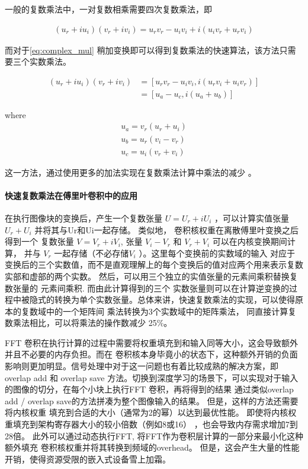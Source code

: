 一般的复数乘法中，一对复数相乘需要四次复数乘法，即

\begin{align}
\label{eq:complex_mul}
(u_r + i u_i)(v_r + i v_i) = u_r v_r - u_i v_i + i ( u_i v_r + u_r v_i )
\end{align}

而对于\ref{eq:complex_mul} 稍加变换即可以得到复数乘法的快速算法，该方法只需要三个实数乘法。

\begin{align}
\label{eq:complex_mul_fast}
  (u_r + i u_i) (v_r + i v_i) &= [ u_r v_r - u_i v_i, i(u_r v_i + u_i v_r)]\\
                               &= [ u_a - u_c,i( u_a + u_b) ]
\end{align}

where 
\begin{align}
u_a = v_r ( u_r + u_i )\\
u_b = u_r ( v_i - v_r )\\
u_c = u_i ( v_r + v_i )
\end{align}

这一方法，通过使用更多的加法实现在复数乘法计算中乘法的减少 。

\paragraph{快速复数乘法在傅里叶卷积中的应用}

在执行图像块的变换后，产生一个复数张量 $U = U_r + i U_i$ ，可以计算实值张量 $U_r + U_i$ 并将其与Ur和Ui一起存储。 类似地， 卷积核权重在离散傅里叶变换之后得到一个
复数张量 $V = V_r + i V_i $, 张量 $V_i - V_r$ 和 $V_r + V_i$ 可以在内核变换期间计算， 并与 $V_r$ 一起存储（不必存储$V_i$ ）。这里每个变换前的实数域的输入
对应于变换后的三个实数值，而不是直观理解上的每个变换后的值对应两个用来表示复数实部和虚部的两个实数。 然后，可以用三个独立的实值张量的元素间乘积替换复数张量的
元素间乘积. 而由此计算得到的三个 实数张量则可以在计算逆变换的过程中被隐式的转换为单个实数张量。总体来讲，快速复数乘法的实现，可以使得原本的复数域中的一个矩阵间
乘法转换为3个实数域中的矩阵乘法， 同直接计算复数乘法相比，可以将乘法的操作数减少 25\%。

FFT 卷积在执行计算的过程中需要将权重填充到和输入同等大小，这会导致额外并且不必要的内存负担。而在
卷积核本身毕竟小的状态下，这种额外开销的负面影响则更加明显。信号处理中对于这一问题也有着比较成熟的解决方案，即 overlap add 和 overlap save
方法。切换到深度学习的场景下，可以实现对于输入的图像的切分，在每个小块上执行FFT 卷积，再将得到的结果
通过类似overlap add / overlap save的方法拼凑为整个图像输入的结果。 但是，这样的方法还需要将内核权重
填充到合适的大小（通常为2的幂）以达到最优性能。 即使将内核权重填充到架构寄存器大小的较小倍数（例如8或16）
，也会导致内存需求增加7到28倍。 此外可以通过动态执行FFT, 将FFT作为卷积层计算的一部分来最小化这种额外填充
卷积核权重并将其转换到频域的overhead。 但是，这会产生大量的性能开销，使得资源受限的嵌入式设备雪上加霜。


